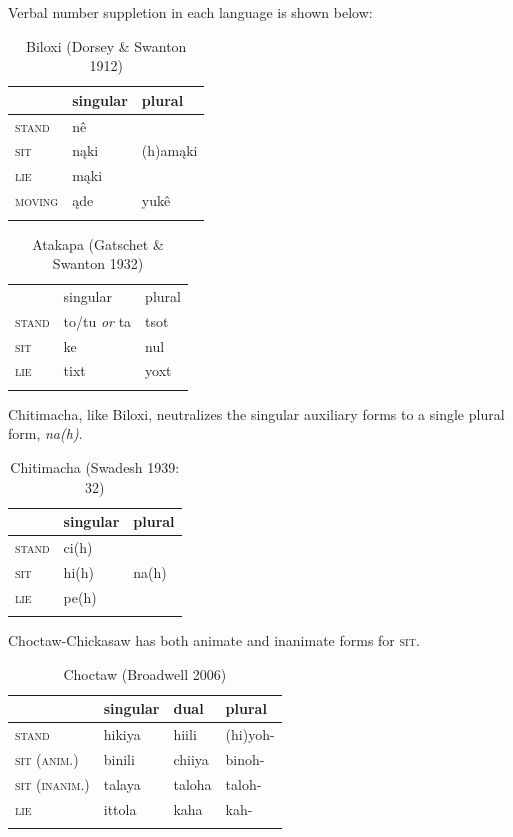 \documentclass[output=paper]{LSP/langsci}
\begin{document}
	Verbal number suppletion in each language is shown below:

\begin{table}
\caption{Biloxi (Dorsey \& Swanton 1912)}
\begin{tabular}[h]{ l l l }
\lsptoprule
& singular & plural \\
\midrule
\textsc{stand} & nê & \\
\textsc{sit} & nąki & (h)amąki \\
 \textsc{lie} & mąki & \\ 
 \textsc{moving} & ąde & yukê \\
 \lspbottomrule
\end{tabular}
\end{table}

\begin{table}
\caption{Atakapa (Gatschet \& Swanton 1932)}
\begin{tabular}[h]{ l l l }
\lsptoprule
& singular & plural \\
\textsc{stand} & to/tu \emph{or} ta & tsot \\
\textsc{sit} & ke & nul \\
\textsc{lie} & tixt & yoxt \\
\lspbottomrule
\end{tabular} 

\end{table}

Chitimacha, like Biloxi, neutralizes the singular auxiliary forms to a single plural form, \emph{na(h)}.

\begin{table}
\caption{Chitimacha (Swadesh 1939: 32)}
\begin{tabular}[h]{ l l l }
\lsptoprule
& singular & plural \\
\midrule
\textsc{stand} & ci(h) &  \\
\textsc{sit} & hi(h) & na(h) \\
 \textsc{lie} & pe(h) &  \\
\lspbottomrule
\end{tabular}
\end{table}

Choctaw-Chickasaw has both animate and inanimate forms for \textsc{sit}.

\begin{table}
\caption{Choctaw (Broadwell 2006)}
\begin{tabular}{llll}
\lsptoprule
 & singular & dual & plural \\
\midrule
\textsc{stand} & hikiya\footnotemark & hiili & (hi)yoh- \\
\textsc{sit (anim.)} & binili & chiiya & binoh- \\
\textsc{sit (inanim.)} & talaya & taloha & taloh- \\
 \textsc{lie} & ittola & kaha & kah- \\
\lspbottomrule
\end{tabular} 
\end{table}
\end{document}
